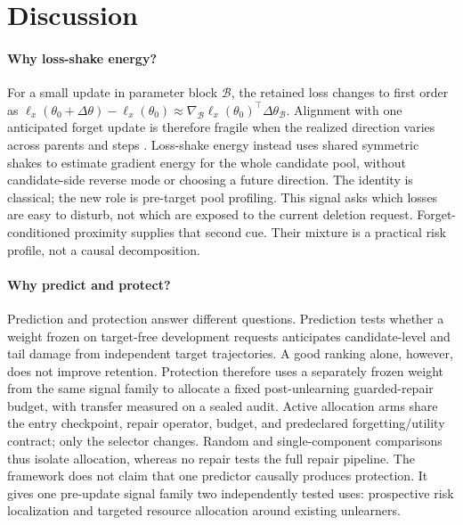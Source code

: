 \section{Discussion}
\label{sec:implications}

\paragraph{Why loss-shake energy?}
For a small update in parameter block $\mathcal B$, the retained loss changes
to first order as
$\ell_x(\theta_0+\Delta\theta)-\ell_x(\theta_0)
\approx\nabla_{\mathcal B}\ell_x(\theta_0)^\top
\Delta\theta_{\mathcal B}$. Alignment with one anticipated forget update is
therefore fragile when the realized direction varies across parents and steps
\cite{wang2025gradient}. Loss-shake energy instead uses shared symmetric
shakes to estimate gradient energy for the whole candidate pool, without
candidate-side reverse mode or choosing a future direction. The identity is
classical; the new role is pre-target pool profiling. This signal asks which
losses are easy to disturb, not which are exposed to the current deletion
request. Forget-conditioned proximity supplies that second cue. Their mixture
is a practical risk profile, not a causal decomposition.

\paragraph{Why predict and protect?}
Prediction and protection answer different questions. Prediction tests
whether a weight frozen on target-free development requests anticipates
candidate-level and tail damage from independent target trajectories. A good
ranking alone, however, does not improve retention. Protection therefore uses
a separately frozen weight from the same signal family to allocate a fixed
post-unlearning guarded-repair budget, with transfer measured on a sealed
audit. Active allocation arms share the entry checkpoint, repair operator,
budget, and predeclared forgetting/utility contract; only the selector
changes. Random and single-component comparisons thus isolate allocation,
whereas no repair tests the full repair pipeline. The framework does not claim
that one predictor causally produces protection. It gives one pre-update
signal family two independently tested uses: prospective risk localization
and targeted resource allocation around existing unlearners.
